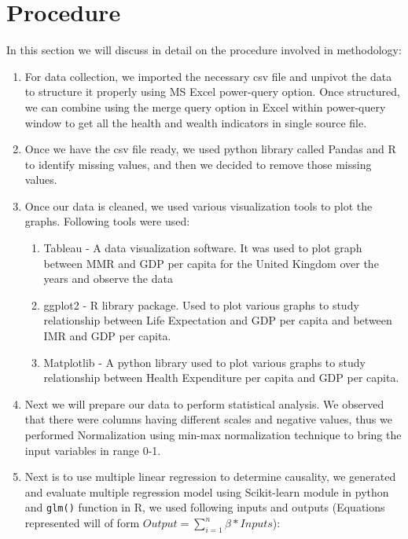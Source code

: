 \documentclass[
]{article}
\providecommand{\tightlist}{%
  \setlength{\itemsep}{0pt}\setlength{\parskip}{0pt}}
\begin{document}
\hypertarget{procedure}{%
\section{Procedure}\label{procedure}}

In this section we will discuss in detail on the procedure involved in
methodology:

\begin{enumerate}
\def\labelenumi{\arabic{enumi}.}
\tightlist
\item
  For data collection, we imported the necessary csv file and unpivot
  the data to structure it properly using MS Excel power-query option.
  Once structured, we can combine using the merge query option in Excel
  within power-query window to get all the health and wealth indicators
  in single source file.
\item
  Once we have the csv file ready, we used python library called Pandas
  and R to identify missing values, and then we decided to remove those
  missing values.
\item
  Once our data is cleaned, we used various visualization tools to plot
  the graphs. Following tools were used:

  \begin{enumerate}
  \def\labelenumii{\arabic{enumii}.}
  \tightlist
  \item
    Tableau - A data visualization software. It was used to plot graph
    between MMR and GDP per capita for the United Kingdom over the years
    and observe the data
  \item
    ggplot2 - R library package. Used to plot various graphs to study
    relationship between Life Expectation and GDP per capita and between
    IMR and GDP per capita.
  \item
    Matplotlib - A python library used to plot various graphs to study
    relationship between Health Expenditure per capita and GDP per
    capita.
  \end{enumerate}
\item
  Next we will prepare our data to perform statistical analysis. We
  observed that there were columns having different scales and negative
  values, thus we performed Normalization using min-max normalization
  technique to bring the input variables in range 0-1.
\item
  Next is to use multiple linear regression to determine causality, we
  generated and evaluate multiple regression model using Scikit-learn
  module in python and \texttt{glm()} function in R, we used following
  inputs and outputs (Equations represented will of form
  \(Output = \sum_{i=1}^{n} \beta*Inputs\)):


\end{enumerate}
\end{document}
